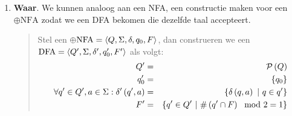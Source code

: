 \documentclass{article}
\begin{document}
\begin{question}
\begin{answer}
\begin{enumerate}
 \item \textbf{Waar}. We kunnen analoog aan een NFA, een constructie maken voor een $\oplus\mbox{NFA}$ zodat we een DFA bekomen die dezelfde taal accepteert.
 \begin{quote}
 \begin{construction}
 Stel een $\oplus\mbox{NFA}=\left\langle Q,\Sigma,\delta,q_0,F \right\rangle$, dan construeren we een $\mbox{DFA}=\left\langle Q',\Sigma,\delta',q_0',F' \right\rangle$ als volgt:
 \begin{eqnarray}
  Q'&=&\mathcal{P}\left( Q \right)\\
  q_0'&=&\left\{ q_0 \right\}\\
  \forall q'\in Q',a\in\Sigma:\delta'\left( q',a \right)&=&\left\{ \delta\left( q,a \right)\ |\ q\in q' \right\}\\
  F'&=&\left\{ q'\in Q'\ |\ \#\left( q'\cap F \right)\mod 2=1 \right\}
 \end{eqnarray}

 \end{construction}
 \end{quote}

\end{enumerate}

\end{answer}
\end{question}
\end{document}
